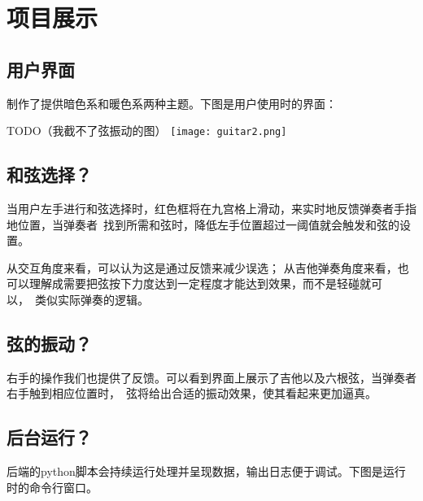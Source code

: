 \chapter{项目展示}

    \section{用户界面}
    制作了提供暗色系和暖色系两种主题。下图是用户使用时的界面：

    TODO（我截不了弦振动的图）
    \texttt{[image: guitar2.png]}

    \section{和弦选择？}
    当用户左手进行和弦选择时，红色框将在九宫格上滑动，来实时地反馈弹奏者手指地位置，当弹奏者\
    找到所需和弦时，降低左手位置超过一阈值就会触发和弦的设置。

    从交互角度来看，可以认为这是通过反馈来减少误选；
    从吉他弹奏角度来看，也可以理解成需要把弦按下力度达到一定程度才能达到效果，而不是轻碰就可以，\
    类似实际弹奏的逻辑。

    \section{弦的振动？}
    右手的操作我们也提供了反馈。可以看到界面上展示了吉他以及六根弦，当弹奏者右手触到相应位置时，\
    弦将给出合适的振动效果，使其看起来更加逼真。

    \section{后台运行？}
    后端的python脚本会持续运行处理并呈现数据，输出日志便于调试。下图是运行时的命令行窗口。
